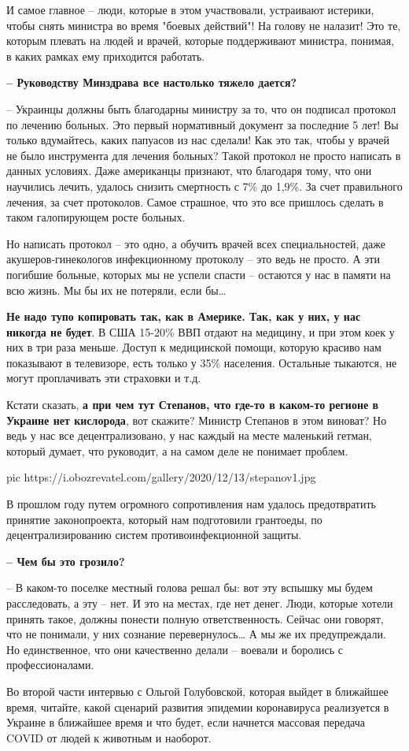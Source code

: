 И самое главное – люди, которые в этом участвовали, устраивают истерики, чтобы
снять министра во время "боевых действий"! На голову не налазит! Это те,
которым плевать на людей и врачей, которые поддерживают министра, понимая, в
каких рамках ему приходится работать.

\textbf{– Руководству Минздрава все настолько тяжело дается?}

– Украинцы должны быть благодарны министру за то, что он подписал протокол по
лечению больных. Это первый нормативный документ за последние 5 лет! Вы только
вдумайтесь, каких папуасов из нас сделали! Как это так, чтобы у врачей не было
инструмента для лечения больных? Такой протокол не просто написать в данных
условиях. Даже американцы признают, что благодаря тому, что они научились
лечить, удалось снизить смертность с 7\% до 1,9\%. За счет правильного лечения,
за счет протоколов. Самое страшное, что это все пришлось сделать в таком
галопирующем росте больных.

Но написать протокол – это одно, а обучить врачей всех специальностей, даже
акушеров-гинекологов инфекционному протоколу – это ведь не просто. А эти
погибшие больные, которых мы не успели спасти – остаются у нас в памяти на всю
жизнь. Мы бы их не потеряли, если бы…

\textbf{Не надо тупо копировать так, как в Америке. Так, как у них, у нас никогда не
будет}. В США 15-20\% ВВП отдают на медицину, и при этом коек у них в три раза
меньше. Доступ к медицинской помощи, которую красиво нам показывают в
телевизоре, есть только у 35\% населения. Остальные тыкаются, не могут
проплачивать эти страховки и т.д.

Кстати сказать, \textbf{а при чем тут Степанов, что где-то в каком-то регионе в Украине
нет кислорода}, вот скажите? Министр Степанов в этом виноват? Но ведь у нас все
децентрализовано, у нас каждый на месте маленький гетман, который думает, что
руководит, а на самом деле не понимает проблем.

\ifcmt
pic https://i.obozrevatel.com/gallery/2020/12/13/stepanov1.jpg
\fi

В прошлом году путем огромного сопротивления нам удалось предотвратить принятие
законопроекта, который нам подготовили грантоеды, по децентрализированию систем
противоинфекционной защиты.

{\bfseries 
– Чем бы это грозило?
}

– В каком-то поселке местный голова решал бы: вот эту вспышку мы будем
расследовать, а эту – нет. И это на местах, где нет денег. Люди, которые хотели
принять такое, должны понести полную ответственность. Сейчас они говорят, что
не понимали, у них сознание перевернулось… А мы же их предупреждали. Но
единственное, что они качественно делали – воевали и боролись с
профессионалами.

Во второй части интервью с Ольгой Голубовской, которая выйдет в ближайшее
время, читайте, какой сценарий развития эпидемии коронавируса реализуется в
Украине в ближайшее время и что будет, если начнется массовая передача COVID от
людей к животным и наоборот.
